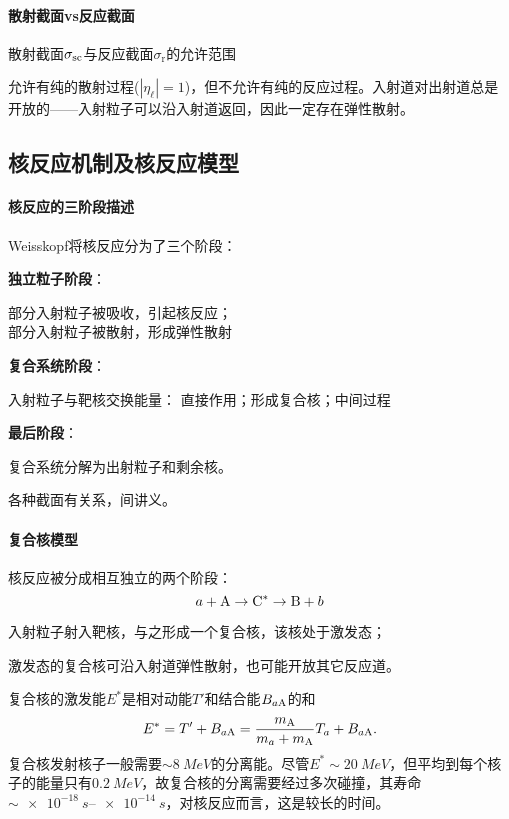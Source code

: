 \paragraph{散射截面vs反应截面}
\begin{center}
	\tikzchap 散射截面$\sigma_{\mathrm{sc}}$与反应截面$\sigma_\mathrm r$的允许范围
\end{center}
允许有纯的散射过程($|\eta_\ell|=1$)，但不允许有纯的反应过程。入射道对出射道总是开放的——入射粒子可以沿入射道返回，因此一定存在弹性散射。
\subsection{核反应机制及核反应模型}
\paragraph{核反应的三阶段描述}Weisskopf将核反应分为了三个阶段：
\begin{compactenum}
	\item \textbf{独立粒子阶段}：
	
	部分入射粒子被吸收，引起核反应；\\
	部分入射粒子被散射，形成弹性散射
	\item \textbf{复合系统阶段}：
	
	入射粒子与靶核交换能量：
	直接作用；形成复合核；中间过程
	\item \textbf{最后阶段}：
	
	复合系统分解为出射粒子和剩余核。
\end{compactenum}
各种截面有关系，间讲义。
\paragraph{复合核模型}核反应被分成相互独立的两个阶段：
\[
	a+\mathrm{A}\to\mathrm{C}^\ast\to\mathrm{B}+b
\]
\begin{compactenum}
	\item 入射粒子射入靶核，与之形成一个复合核，该核处于激发态；
	\item 激发态的复合核可沿入射道弹性散射，也可能开放其它反应道。
\end{compactenum}
复合核的激发能$E^\ast$是相对动能$T'$和结合能$B_{a\mathrm{A}}$的和
\begin{align}
	E^\ast=T'+B_{a\mathrm{A}}=\frac{m_{\mathrm{A}}}{m_a+m_{\mathrm{A}}}T_a+B_{a\mathrm{A}}.
\end{align}
复合核发射核子一般需要$\sim\SI{8}{MeV}$的分离能。尽管$E^\ast\sim\SI{20}{MeV}$，但平均到每个核子的能量只有$\SI{0.2}{MeV}$，故复合核的分离需要经过多次碰撞，其寿命$\sim\SIrange{e-18}{e-14}{s}$，对核反应而言，这是较长的时间。


